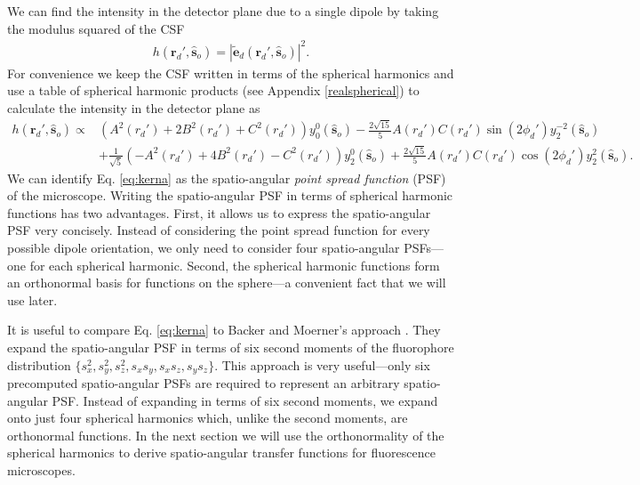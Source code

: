 \documentclass[11pt]{article}
\providecommand{\mb}[1]{\mathbf{#1}}
\providecommand{\so}[1]{\mathbf{\hat{s}}_o}
\providecommand{\rd}[1]{\mathbf{r}_d}
\begin{document}
We can find the intensity in the detector plane due to a single dipole
by taking the modulus squared of the CSF
\begin{align}
  h(\rd{}', \so{}) = \left|\tilde{\mb{e}}_d(\rd{}', \so{})\right|^2 \label{eq:kernel}.
\end{align}
For convenience we keep the CSF written in terms of the spherical harmonics and
use a table of spherical harmonic products (see Appendix \ref{realspherical}) to
calculate the intensity in the detector plane as
\begin{equation}
  \begin{split}
  h(\rd{}', \so{}) \propto &\left(A^2(r_d') + 2B^2(r_d') + C^2(r_d')\right)y_0^0(\so{}) -\frac{2\sqrt{15}}{5}A(r_d')C(r_d')\sin(2\phi_d')y_2^{-2}(\so{})\\ &+ \frac{1}{\sqrt{5}}\left(-A^2(r_d') + 4B^2(r_d') - C^2(r_d')\right)y_2^{0}(\so{}) +\frac{2\sqrt{15}}{5}A(r_d')C(r_d')\cos(2\phi_d')y_2^{2}(\so{}). \label{eq:kerna}
\end{split}
\end{equation}
We can identify Eq. \ref{eq:kerna} as the spatio-angular \textit{point spread
  function} (PSF) of the microscope. Writing the spatio-angular PSF in terms of
spherical harmonic functions has two advantages. First, it allows us to express
the spatio-angular PSF very concisely. Instead of considering the point spread
function for every possible dipole orientation, we only need to consider four
spatio-angular PSFs---one for each spherical harmonic. Second, the spherical
harmonic functions form an orthonormal basis for functions on the sphere---a
convenient fact that we will use later.

It is useful to compare Eq. \ref{eq:kerna} to Backer and Moerner's approach
\cite{backer2014}. They expand the spatio-angular PSF in terms of six second
moments of the fluorophore distribution
$\{s_x^2, s_y^2, s_z^2, s_xs_y, s_xs_z, s_ys_z\}$. This approach is very
useful---only six precomputed spatio-angular PSFs are required to represent an
arbitrary spatio-angular PSF. Instead of expanding in terms of six second
moments, we expand onto just four spherical harmonics which, unlike the second
moments, are orthonormal functions. In the next section we will use the
orthonormality of the spherical harmonics to derive spatio-angular transfer
functions for fluorescence microscopes.
\end{document}
